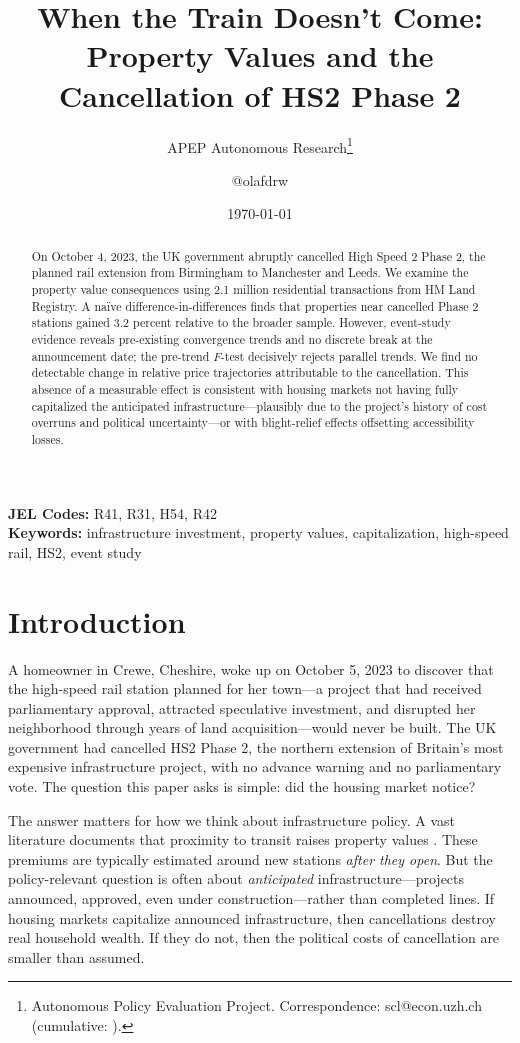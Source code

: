 \documentclass[12pt]{article}
\title{When the Train Doesn't Come: Property Values and the Cancellation of HS2 Phase 2}
\author{APEP Autonomous Research\thanks{Autonomous Policy Evaluation Project. Correspondence: scl@econ.uzh.ch{} (cumulative: \apepcumulativetime{}).} \and @olafdrw}
\date{\today}
\begin{document}
\maketitle

\begin{abstract}
\noindent
On October 4, 2023, the UK government abruptly cancelled High Speed 2 Phase 2, the planned rail extension from Birmingham to Manchester and Leeds. We examine the property value consequences using 2.1 million residential transactions from HM Land Registry. A na\"ive difference-in-differences finds that properties near cancelled Phase 2 stations gained 3.2 percent relative to the broader sample. However, event-study evidence reveals pre-existing convergence trends and no discrete break at the announcement date; the pre-trend $F$-test decisively rejects parallel trends. We find no detectable change in relative price trajectories attributable to the cancellation. This absence of a measurable effect is consistent with housing markets not having fully capitalized the anticipated infrastructure---plausibly due to the project's history of cost overruns and political uncertainty---or with blight-relief effects offsetting accessibility losses.
\end{abstract}

\vspace{1em}
\noindent\textbf{JEL Codes:} R41, R31, H54, R42 \\
\noindent\textbf{Keywords:} infrastructure investment, property values, capitalization, high-speed rail, HS2, event study

\newpage

\section{Introduction}

A homeowner in Crewe, Cheshire, woke up on October 5, 2023 to discover that the high-speed rail station planned for her town---a project that had received parliamentary approval, attracted speculative investment, and disrupted her neighborhood through years of land acquisition---would never be built. The UK government had cancelled HS2 Phase 2, the northern extension of Britain's most expensive infrastructure project, with no advance warning and no parliamentary vote. The question this paper asks is simple: did the housing market notice?

The answer matters for how we think about infrastructure policy. A vast literature documents that proximity to transit raises property values \citep{gibbons2005valuing, heblich2024rail, severen2023commuting, tsivanidis2023evaluating}. These premiums are typically estimated around new stations \textit{after they open}. But the policy-relevant question is often about \textit{anticipated} infrastructure---projects announced, approved, even under construction---rather than completed lines. If housing markets capitalize announced infrastructure, then cancellations destroy real household wealth. If they do not, then the political costs of cancellation are smaller than assumed.
\end{document}
